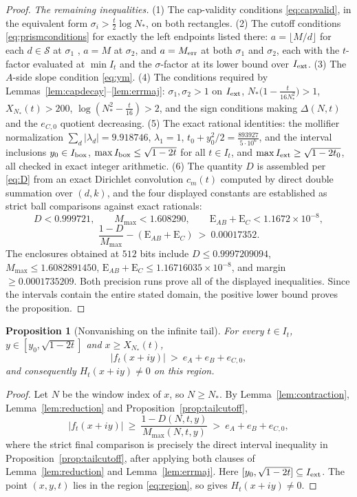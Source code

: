 \documentclass[11pt]{article}
\newtheorem{proposition}[theorem]{Proposition}
\theoremstyle{definition}
\newcommand{\calS}{\mathcal{S}}
\begin{document}
\begin{proof}
\emph{The remaining inequalities.} (1) The cap-validity conditions
\eqref{eq:capvalid}, in the equivalent form
$\sigma_i>\frac t2\log N_*$, on both rectangles. (2) The cutoff conditions
\eqref{eq:prismconditions} for exactly the left endpoints listed there:
$a=\lfloor M/d\rfloor$ for each $d\in\calS$ at $\sigma_1$
, $a=M$ at $\sigma_2$, and
$a=M_{\rm err}$ at both $\sigma_1$ and $\sigma_2$, each with the $t$-factor evaluated at
$\min I_t$ and the $\sigma$-factor at its lower bound over
$I_{\rm ext}$. (3) The $A$-side slope condition \eqref{eq:ym}.
(4) The conditions required by
Lemmas~\ref{lem:capdecay}--\ref{lem:errmaj}: $\sigma_1,\sigma_2>1$
on $I_{\rm ext}$, $N_*\bigl(1-\frac t{16N_*^2}\bigr)>1$,
$X_{N_*}(t)>200$, $\log(N_*^2-\frac t{16})>2$, and the sign
conditions making $\Delta(N,t)$ and the $e_{C,0}$ quotient
decreasing. (5) The exact rational identities: the mollifier
normalization $\sum_d|\lambda_d|=9.918746$, $\lambda_1=1$,
$t_0+y_0^2/2=\frac{893927}{5\cdot10^6}$, and the interval inclusions
$y_0\in I_{\rm box}$,
$\max I_{\rm box}\le\sqrt{1-2t}$ for all $t\in I_t$, and
$\max I_{\rm ext}\ge\sqrt{1-2t_0}$, all checked in exact integer
arithmetic. (6) The quantity $D$ is assembled per \eqref{eq:D}
from an exact Dirichlet convolution $c_m(t)$ computed by direct
double summation over $(d,k)$, and the four displayed constants
are established as strict ball comparisons against exact rationals:
\[
D<0.999721,\qquad M_{\max}<1.608290,\qquad
\mathrm{E}_{AB}+\mathrm{E}_{C}<1.1672\times10^{-8},
\]
\[
\frac{1-D}{M_{\max}}-(\mathrm{E}_{AB}+\mathrm{E}_{C})
\ >\ 0.00017352 .
\]
The enclosures obtained at $512$ bits include
$D\le0.9997209094$, $M_{\max}\le1.6082891450$,
$\mathrm{E}_{AB}+\mathrm{E}_{C}\le1.16716035\times10^{-8}$, and
margin $\ge0.0001735209$. Both precision runs prove all of the displayed
inequalities. Since the intervals contain the entire stated domain, the positive lower bound proves the
proposition.
\end{proof}

\begin{proposition}[Nonvanishing on the infinite tail]\label{thm:tail}
For every $t\in I_t$, $y\in[y_0,\sqrt{1-2t}]$ and
$x\ge X_{N_*}(t)$,
\[
|f_t(x+iy)|\ >\ e_A+e_B+e_{C,0},
\]
and consequently $H_t(x+iy)\ne0$ on this region.
\end{proposition}

\begin{proof}
Let $N$ be the window index of $x$, so $N\ge N_*$. By
Lemma~\ref{lem:contraction}, Lemma~\ref{lem:reduction} and
Proposition~\ref{prop:tailcutoff},
\[
|f_t(x+iy)|\ \ge\ \frac{1-D(N,t,y)}{M_{\max}(N,t,y)}
\ >\ e_A+e_B+e_{C,0},
\]
where the strict final comparison is precisely the direct interval
inequality in Proposition~\ref{prop:tailcutoff}, after applying both clauses
of Lemma~\ref{lem:reduction} and Lemma~\ref{lem:errmaj}. Here
$[y_0,\sqrt{1-2t}]\subseteq I_{\rm ext}$. The point $(x,y,t)$
lies in the region \eqref{eq:region}, so
\cite[Corollary~1.4]{Polymath} gives $H_t(x+iy)\neq0$.
\end{proof}
\end{document}
